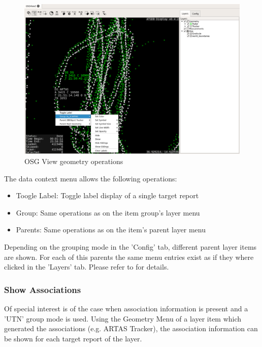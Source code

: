 \begin{figure}[H]
    \hspace*{-2cm}
    \includegraphics[width=18cm,frame]{../screenshots/osgview_data_operations.png}
  \caption{OSG View geometry operations}
\end{figure}

The data context menu allows the following operations:

\begin{itemize}
 \item Toogle Label: Toggle label display of a single target report
 \item Group: Same operations as on the item group's layer menu
 \item Parents: Same operations as on the item's parent layer menu
\end{itemize}

Depending on the grouping mode in the 'Config' tab, different parent layer items are shown. For each of this parents the same menu entries exist as if they where clicked in the 'Layers' tab. Please refer to  for details.

\subsubsection{Show Associations}

Of special interest is of the case when association information is present and a 'UTN' group mode is used. Using the Geometry Menu of a layer item which generated the associations (e.g. ARTAS Tracker), the association information can be shown for each target report of the layer.

